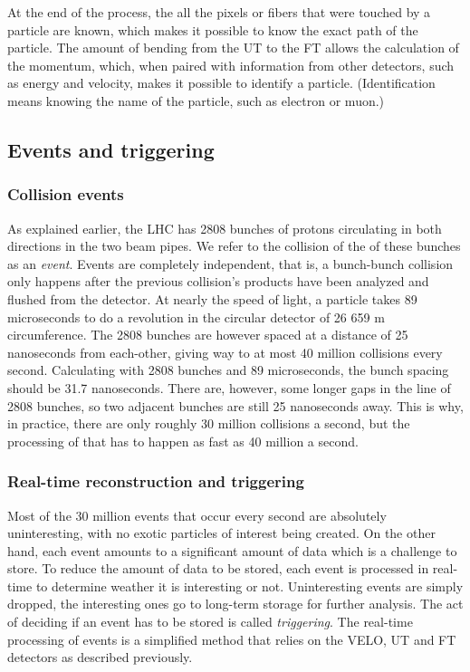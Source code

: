 \documentclass[12pt]{article}
\begin{document}
At the end of the process, the all the pixels or fibers that were touched by a particle are known, which makes it possible to know the exact path of the particle. The amount of bending from the UT to the FT allows the calculation of the momentum, which, when paired with information from other detectors, such as energy and velocity, makes it possible to identify a particle. (Identification means knowing the name of the particle, such as electron or muon.)


\subsection{Events and triggering}\label{sec_events_trigger}


\subsubsection{Collision events}\label{sec_event_what}

As explained earlier, the LHC has 2808 bunches of protons circulating in both directions in the two beam pipes. We refer to the collision of the of these bunches as an \textit{event}. Events are completely independent, that is, a bunch-bunch collision only happens after the previous collision's products have been analyzed and flushed from the detector. At nearly the speed of light, a particle takes 89 microseconds to do a revolution in the circular detector of 26 659 m circumference. The 2808 bunches are however spaced at a distance of 25 nanoseconds from each-other, giving way to at most 40 million collisions every second. Calculating with 2808 bunches and 89 microseconds, the bunch spacing should be 31.7 nanoseconds. There are, however, some longer gaps in the line of 2808 bunches, so two adjacent bunches are still 25 nanoseconds away. This is why, in practice, there are only roughly 30 million collisions a second, but the processing of that has to happen as fast as 40 million a second.


\subsubsection{Real-time reconstruction and triggering}\label{sec_trigger_what}

Most of the 30 million events that occur every second are absolutely uninteresting, with no exotic particles of interest being created. On the other hand, each event amounts to a significant amount of data which is a challenge to store. To reduce the amount of data to be stored, each event is processed in real-time to determine weather it is interesting or not. Uninteresting events are simply dropped, the interesting ones go to long-term storage for further analysis. The act of deciding if an event has to be stored is called \textit{triggering}. The real-time processing of events is a simplified method that relies on the VELO, UT and FT detectors as described previously.
\end{document}
